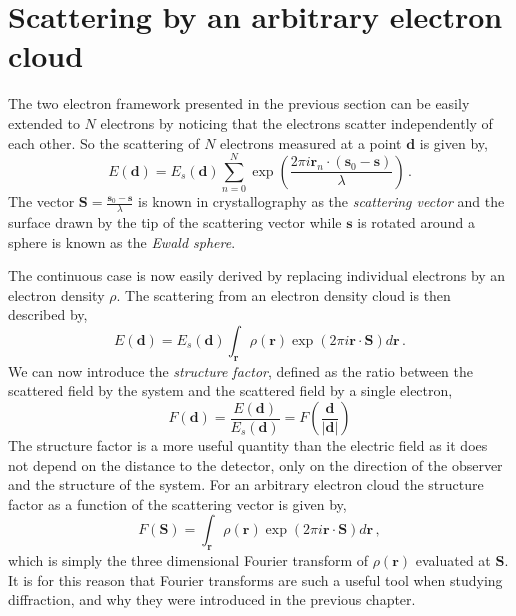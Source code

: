 \section{Scattering by an arbitrary electron cloud}\label{scat_cloud}

The two electron framework presented in the previous section can be easily
extended to $N$ electrons by noticing that the electrons scatter independently
of each other. So the scattering of $N$ electrons measured at a point $\mathbf d$
is given by,
\begin{equation}
E(\mathbf d) = E_s(\mathbf d) \sum_{n=0}^N \exp\left(\frac{2 \pi i \mathbf r_n \cdot(\mathbf s_0 -
\mathbf s)}{\lambda}\right) \, .
\end{equation}
The vector $\mathbf S = \frac{\mathbf s_0 - \mathbf s}{\lambda}$ is known in crystallography
as the {\em scattering vector} and the surface drawn by the tip of the
scattering vector while $\mathbf s$ is rotated around a sphere is known as the
{\em Ewald sphere}.

The continuous case is now easily derived by replacing individual electrons by
an electron density $\rho$. The scattering from an electron density cloud is
then described by,
\begin{equation}
E(\mathbf d) = E_s(\mathbf d) \int_{\mathbf r} \rho(\mathbf r) \exp\left(2
    \pi i \mathbf r \cdot \mathbf S \right) d\mathbf r\, .
\end{equation}
We can now introduce the {\em structure factor}, defined as the ratio between
the scattered field by the system and the scattered field by a single
electron,
\begin{equation}
F(\mathbf d) = \frac{E(\mathbf d)}{E_s(\mathbf d)} = F\left(\frac{\mathbf d}{|\mathbf d|}\right)
\end{equation}
The structure factor is a more useful quantity than the electric field as it does not depend
on the distance to the detector, only on the direction of the observer and the
structure of the system. For an arbitrary electron cloud the structure factor as
a function of the scattering vector is given by,
\begin{equation}
F(\mathbf S) = \int_{\mathbf r} \rho(\mathbf r) \exp\left(2
    \pi i \mathbf r \cdot \mathbf S \right) d\mathbf r\, ,
\end{equation}
which is simply the three dimensional Fourier transform of $\rho(\mathbf r)$
evaluated at $\mathbf S$. It is for this reason that Fourier transforms are such
a useful tool when studying diffraction, and why they were introduced in the
previous chapter.

